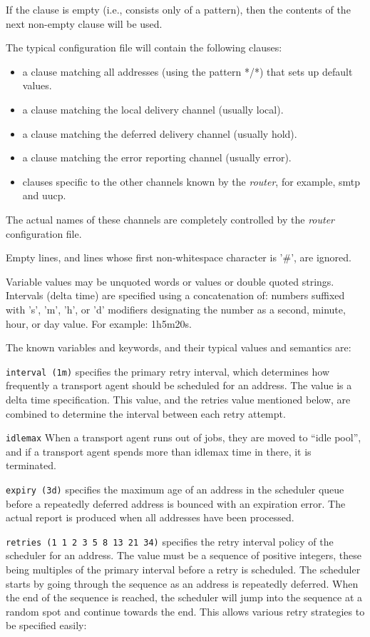 If the clause is empty (i.e., consists only of a pattern),
then the contents of the next non-empty clause will be used.

The typical configuration file will contain the following clauses:
\begin{itemize}
\item a clause matching all addresses (using the pattern */*) that sets 
up default values.
\item a  clause  matching  the  local delivery channel
(usually local).
\item a clause matching the deferred    delivery  channel
(usually hold).
\item a  clause  matching  the error reporting channel
(usually error).
\item clauses specific to the other channels    known  by
the {\em router}, for example, smtp and uucp.
\end{itemize}


The  actual  names  of  these channels are completely 
controlled by the {\em router} configuration file.

Empty  lines,  and  lines   whose   first   non-whitespace
character is '\#', are ignored.

Variable values may be unquoted words or values or double 
quoted strings.  Intervals  (delta  time)  are  specified
using  a concatenation of: numbers suffixed with 's', 'm',
'h', or 'd' modifiers designating the number as a  second,
minute, hour, or day value.  For example: 1h5m20s.

The known variables and keywords, and their typical values
and semantics are:

{\tt interval (1m)}
specifies the primary retry interval, which determines how frequently a 
transport agent should be scheduled for an address. The value is a delta
time specification. This value, and the retries value mentioned below, 
are combined to determine the interval between each retry attempt.

{\tt idlemax}
When a transport agent runs out of jobs, they are moved
to ``idle pool'', and if a transport agent spends more than idlemax
time in there, it is terminated.

{\tt expiry (3d)}
specifies  the  maximum age of an address in the scheduler 
queue before  a repeatedly  deferred  address  is
bounced with an expiration error.  The actual report is
produced when all addresses have been processed.

{\tt retries (1 1 2 3 5 8 13 21 34)} 
specifies the retry interval policy  of the scheduler 
for an address. The value must be a sequence of positive integers, these 
being multiples of the primary interval  before  a  retry is scheduled. 
The scheduler starts by going through the sequence as an  address  is 
repeatedly deferred. When the end of the sequence is reached, the scheduler 
will jump into the sequence at a random  spot and continue towards the end.  
This allows various retry strategies to be specified easily:

